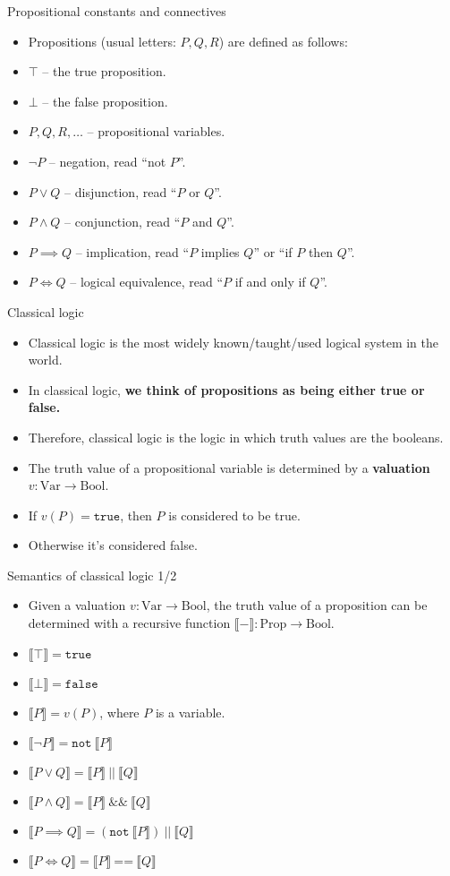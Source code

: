 \documentclass{beamer}
\newcommand{\m}[1]{\texttt{#1}}
\newcommand{\true}{\m{true}}
\newcommand{\false}{\m{false}}
\newcommand{\mnotb}[1]{\m{not}\ #1}
\newcommand{\mandb}[2]{#1\ \m{\&\&}\ #2}
\newcommand{\morb}[2]{#1\ \m{||}\ #2}
\newcommand{\sem}[1]{\llbracket #1 \rrbracket}
\begin{document}
\begin{frame}{Propositional constants and connectives}
\begin{itemize}
	\item Propositions (usual letters: $P, Q, R$) are defined as follows:
	\item $\top$ -- the true proposition.
	\item $\bot$ -- the false proposition.
	\item $P, Q, R, \dots$ -- propositional variables.
	\item $\neg P$ -- negation, read ``not $P$''.
	\item $P \lor Q$ -- disjunction, read ``$P$ or $Q$''.
	\item $P \land Q$ -- conjunction, read ``$P$ and $Q$''.
	\item $P \implies Q$ -- implication, read ``$P$ implies $Q$'' or ``if $P$ then $Q$''.
	\item $P \iff Q$ -- logical equivalence, read ``$P$ if and only if $Q$''.
\end{itemize}
\end{frame}

\begin{frame}{Classical logic}
\begin{itemize}
	\item Classical logic is the most widely known/taught/used logical system in the world.
	\item In classical logic, \textbf{we think of propositions as being either true or false.}
	\item Therefore, classical logic is the logic in which truth values are the booleans.
	\item The truth value of a propositional variable is determined by a \textbf{valuation} $v : \text{Var} \to \text{Bool}$.
	\item If $v(P) = \true$, then $P$ is considered to be true.
	\item Otherwise it's considered false.
\end{itemize}
\end{frame}

\begin{frame}{Semantics of classical logic 1/2}
\begin{itemize}
	\item Given a valuation $v : \text{Var} \to \text{Bool}$, the truth value of a proposition can be determined with a recursive function $\sem{-} : \text{Prop} \to \text{Bool}$.
	\item $\sem{\top} = \true$
	\item $\sem{\bot} = \false$
	\item $\sem{P} = v(P)$, where $P$ is a variable.
	\item $\sem{\neg P} = \mnotb{\sem{P}}$
	\item $\sem{P \lor Q} = \morb{\sem{P}}{\sem{Q}}$
	\item $\sem{P \land Q} = \mandb{\sem{P}}{\sem{Q}}$
	\item $\sem{P \implies Q} = \morb{(\mnotb{\sem{P}})}{\sem{Q}}$
	\item $\sem{P \iff Q} = \sem{P}\ \m{==}\ \sem{Q}$
\end{itemize}
\end{frame}
\end{document}
